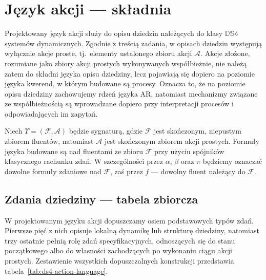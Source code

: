 \documentclass[11pt,a4paper]{article}
\theoremstyle{definition}
\begin{document}
\section{Język akcji --- składnia}
\label{sec:skladnia}

Projektowany język akcji służy do opisu dziedzin należących do klasy $\mathbb{DS4}$ systemów dynamicznych. Zgodnie z treścią zadania, w opisach dziedzin występują wyłącznie akcje proste, tj.\ elementy ustalonego zbioru akcji $\mathcal{A}$. Akcje złożone, rozumiane jako zbiory akcji prostych wykonywanych współbieżnie, nie należą zatem do składni języka opisu dziedziny, lecz pojawiają się dopiero na poziomie języka kwerend, w którym budowane są procesy. Oznacza to, że na poziomie opisu dziedziny zachowujemy rdzeń języka AR, natomiast mechanizmy związane ze współbieżnością są wprowadzane dopiero przy interpretacji procesów i odpowiadających im zapytań.

Niech $\Upsilon=(\mathcal{F},\mathcal{A})$ będzie sygnaturą, gdzie $\mathcal{F}$ jest skończonym, niepustym zbiorem fluentów, natomiast $\mathcal{A}$ jest skończonym zbiorem akcji prostych. Formuły języka budowane są nad fluentami ze zbioru $\mathcal{F}$ przy użyciu spójników klasycznego rachunku zdań. W szczególności przez $\alpha$, $\beta$ oraz $\pi$ będziemy oznaczać dowolne formuły zdaniowe nad $\mathcal{F}$, zaś przez $f$ --- dowolny fluent należący do $\mathcal{F}$.

\subsection{Zdania dziedziny --- tabela zbiorcza}

W projektowanym języku akcji dopuszczamy osiem podstawowych typów zdań. Pierwsze pięć z nich opisuje lokalną dynamikę lub strukturę dziedziny, natomiast trzy ostatnie pełnią rolę zdań specyfikacyjnych, odnoszących się do stanu początkowego albo do własności zachodzących po wykonaniu ciągu akcji prostych. Zestawienie wszystkich dopuszczalnych konstrukcji przedstawia tabela~\ref{tab:ds4-action-language}.
\end{document}
